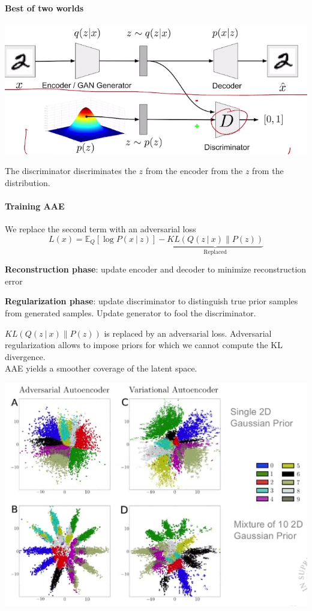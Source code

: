 \documentclass[10pt]{report}
\begin{document}
\paragraph{Best of two worlds}
\begin{center}
	\includegraphics[scale=0.5]{153.png}
\end{center}
The discriminator discriminates the $z$ from the encoder from the $z$ from the distribution.
\paragraph{Training AAE} We replace the second term with an adversarial loss
$$L(x) = \mathbb{E}_Q[\log P(x\:|\:z)]-\underset{\text{Replaced}}{\underbrace{KL(Q(z\:|\:x)\|P(z))}}$$
\begin{list}{}{}
	\item \textbf{Reconstruction phase}: update encoder and decoder to minimize reconstruction error
	\item \textbf{Regularization phase}: update discriminator to distinguish true prior samples from generated samples. Update generator to fool the discriminator.
\end{list}
$KL(Q(z\:|\:x)\|P(z))$ is replaced by an adversarial loss. Adversarial regularization allows to impose priors for which we cannot compute the KL divergence.\\
AAE yields a smoother coverage of the latent space.
\begin{center}
	\includegraphics[scale=0.5]{154.png}
\end{center}
\end{document}

